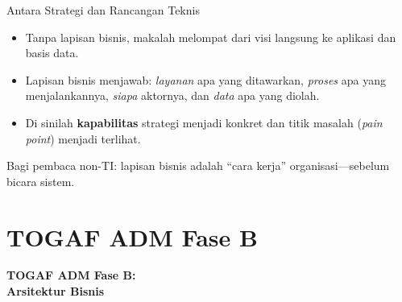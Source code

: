 \documentclass[aspectratio=169, table]{beamer}
\newcommand{\sectionframe}[1]{%
  \begin{frame}{\hfill}
    \centering
    \Huge{\textbf{#1}}
  \end{frame}
}
\newcommand{\takeaway}[1]{%
  \vspace{4pt}
  {\footnotesize #1}
}
\begin{document}
\begin{frame}{Antara Strategi dan Rancangan Teknis}
  \vspace{6pt}
  \begin{itemize}
    \item Tanpa lapisan bisnis, makalah melompat dari visi langsung ke aplikasi
          dan basis data.
    \item Lapisan bisnis menjawab: \emph{layanan} apa yang ditawarkan,
          \emph{proses} apa yang menjalankannya, \emph{siapa} aktornya, dan
          \emph{data} apa yang diolah.
    \item Di sinilah \textbf{kapabilitas} strategi menjadi konkret dan titik
          masalah (\emph{pain point}) menjadi terlihat.
  \end{itemize}
  \takeaway{Bagi pembaca non-TI: lapisan bisnis adalah ``cara kerja''
  organisasi---sebelum bicara sistem.}
\end{frame}

\section{TOGAF ADM Fase B}
\sectionframe{TOGAF ADM Fase B:\\ Arsitektur Bisnis}
\end{document}
